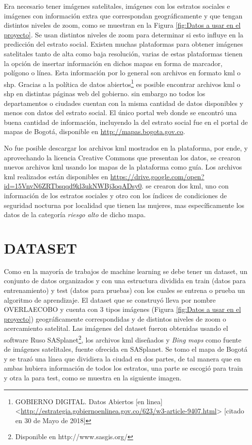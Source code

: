  Era necesario tener imágenes satelitales, imágenes con los estratos sociales e imágenes con información extra que correspondan geográficamente y que tengan distintos niveles de zoom, como se muestran en la Figura \ref{fig:Datos a usar en el proyecto}. Se usan distintos niveles de zoom para determinar si esto influye en la predicción del estrato social. Existen muchas plataformas para obtener imágenes satelitales tanto de alta como baja resolución, varias de estas plataformas tienen la opción de insertar información en dichos mapas en forma de marcador, polígono o línea. Esta información por lo general son archivos en formato kml o shp. Gracias a la política de datos abiertos\footnote[13]{GOBIERNO DIGITAL. Datos Abiertos [en linea] <\url{http://estrategia.gobiernoenlinea.gov.co/623/w3-article-9407.html}> [citado en 30 de Mayo de 2018]} es posible encontrar archivos kml o shp en distintas páginas web del gobierno. sin embargo no todos los departamentos o ciudades cuentan con la misma cantidad de datos disponibles y menos con datos del estrato social. El único portal web donde se encontró una buena cantidad de información, incluyendo la del estrato social fue en el portal de mapas de Bogotá, disponible en \url{http://mapas.bogota.gov.co}.
 
 No fue posible descargar los archivos kml mostrados en la plataforma, por ende, y aprovechando la licencia Creative Commons que presentan los datos, se crearon nuevos archivos kml usando los mapas de la plataforma como guía. Los archivos kml realizados están disponibles en \url{https://drive.google.com/open?id=15VnvN6ZRTbsqqd9kl3ukNWBj3oqADsy0}. se crearon dos kml, uno con información de los estratos sociales y otro con los índices de condiciones de seguridad nocturna por localidad que tienen las mujeres, mas específicamente los datos de la categoría \textit{riesgo alto} de dicho mapa. 


 \section{DATASET}
 Como en la mayoría de trabajos de machine learning se debe tener un dataset, un conjunto de datos organizados y con una estructura dividida en train (datos para entrenamiento) y test (datos para pruebas) con los cuales se entrena o prueba un algoritmo de aprendizaje. El dataset que se construyó lleva por nombre OVERLAECOBO y cuenta con 3 tipos imágenes (Figura \ref{fig:Datos a usar en el proyecto}) geográficamente correspondidas y de distintos niveles de zoom o acercamiento satelital. Las imágenes del dataset fueron obtenidas usando el software Ruso SASplanet\footnote[14]{Disponible en http://www.sasgis.org/}, los archivos kml diseñados y \textit{Bing maps} como fuente de imágenes satelitales, fuente ofrecida en SASplanet. Se tomo el mapa de Bogotá y se trazó una línea que dividiera la ciudad en dos partes, de tal manera que en ambas hubiera información de todos los estratos, una parte se escogió para train y otra la para test, como se muestra en la siguiente imagen.
 
